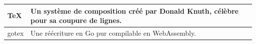 \documentclass{article}
\begin{document}
\hsize=380pt
\begin{tabular}{|l|p{6cm}|}
\hline
TeX & Un syst\`eme de composition cr\'e\'e par Donald Knuth, c\'el\`ebre pour sa coupure de lignes. \\
\hline
gotex & Une r\'e\'ecriture en Go pur compilable en WebAssembly. \\
\hline
\end{tabular}
\end{document}

